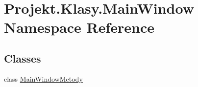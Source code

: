 \hypertarget{namespace_projekt_1_1_klasy_1_1_main_window}{}\section{Projekt.\+Klasy.\+Main\+Window Namespace Reference}
\label{namespace_projekt_1_1_klasy_1_1_main_window}
\subsection*{Classes}
\begin{DoxyCompactItemize}
\item 
class \mbox{\hyperlink{class_projekt_1_1_klasy_1_1_main_window_1_1_main_window_metody}{Main\+Window\+Metody}}
\end{DoxyCompactItemize}
